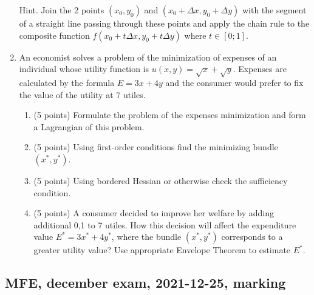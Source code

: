 \begin{enumerate}
      
      Hint. Join the 2 points $(x_0, y_0)$ and $(x_0 + \Delta x, y_0 + \Delta y)$ with the segment of a straight line passing through these points 
      and apply the chain rule to the composite function $f(x_0 + t \Delta x, y_0 + t \Delta y)$ where $t\in [0;1]$.
      
      
        \item An economist solves a problem of the minimization of expenses of an individual whose utility function is $u(x, y) = \sqrt{x} + \sqrt{y}$. 
      Expenses are calculated by the formula $E=3x + 4y$ and the consumer would prefer to fix the value of the utility at 7 utiles.
      \begin{enumerate}
      \item (5 points) Formulate the problem of the expenses minimization and form a Lagrangian of this problem.
      \item (5 points) Using first-order conditions find the minimizing bundle $(x^*, y^*)$.
      \item (5 points) Using bordered Hessian or otherwise check the sufficiency condition.
      \item (5 points) A consumer decided to improve her welfare by adding additional 0,1 to 7 utiles. 
      How this decision will affect the expenditure value $E^* = 3x^* + 4y^*$, 
      where the bundle $(x^*, y^*)$ corresponds to a greater utility value? 
      Use appropriate Envelope Theorem to estimate $E^*$.
    \end{enumerate}
    
    \end{enumerate}


\subsection{MFE, december exam, 2021-12-25, marking}

